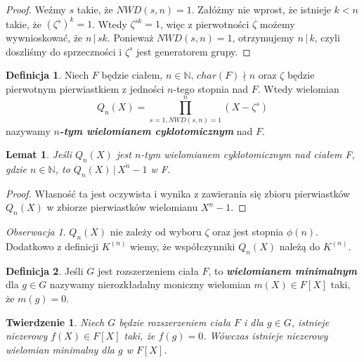 \documentclass[declaration,shortabstract]{iithesis}
\theoremstyle{definition}
\newtheorem{definition}{Definicja}
\theoremstyle{remark} \newtheorem{observation}{Obserwacja}
\theoremstyle{plain} \newtheorem{theorem}{Twierdzenie}
\theoremstyle{plain} \newtheorem{lemma}{Lemat}
\theoremstyle{remark} \newtheorem*{remark*}{Uwaga}
\theoremstyle{reminder} \newtheorem*{reminder*}{Przypomnienie}
\begin{document}
\begin{proof}
    Weźmy $s$ takie, że $NWD(s, n) = 1$. Załóżmy nie wprost, że istnieje $k < n$ takie, że $(\zeta^s)^k = 1$. Wtedy $\zeta^{sk} = 1$, więc z pierwotności $\zeta$ możemy wywnioskować, że $n \, | \, sk$. Ponieważ $NWD(s, n) = 1$, otrzymujemy $n \, | \, k$, czyli doszliśmy do sprzeczności i $\zeta^s$ jest generatorem grupy.
\end{proof}
	
\begin{definition}
	Niech $F$ będzie ciałem, $n \in \mathbb{N}, \, char(F) \nmid n$ oraz $\zeta$ będzie pierwotnym pierwiastkiem z jedności $n$-tego stopnia nad $F$. Wtedy wielomian \[Q_n(X) = \prod_{s = 1, NWD(s, n) = 1}^{n}(X - \zeta^s)\] nazywamy \textit{\textbf{$n$-tym wielomianem cyklotomicznym}} nad $F$.
\end{definition}
	
\begin{lemma}\label{cyklo_dzieli}
	Jeśli $Q_n(X)$ jest $n$-tym wielomianem cyklotomicznym nad ciałem F, gdzie $n\in \mathbb{N}$, to $Q_n(X) \, | \, X^n - 1$ w F.
\end{lemma}
	
\begin{proof} 
	Własność ta jest oczywista i wynika z zawierania się zbioru pierwiastków $Q_n(X)$ w zbiorze pierwiastków wielomianu $X^n - 1$.
\end{proof}
	
\begin{observation}
	$Q_n(X)$ nie zależy od wyboru $\zeta$ oraz jest stopnia $\phi(n)$. Dodatkowo z definicji $K^{(n)}$ wiemy, że współczynniki $Q_n(X)$ należą do $K^{(n)}$.
\end{observation}
    

\begin{definition}
	Jeśli $G$ jest rozszerzeniem ciała $F$, to \textbf{\textit{wielomianem minimalnym}} dla $g \in G$ nazywamy nierozkładalny moniczny wielomian $m(X) \in F[X]$ taki, że $m(g) = 0$.
\end{definition}
	
\begin{theorem}\label{istnieje_mini}
	Niech $G$ będzie rozszerzeniem ciała $F$ i dla $g \in G$, istnieje niezerowy $f(X) \in F[X]$ taki, że $ f(g) = 0$. Wówczas istnieje niezerowy wielomian minimalny dla $g$ w $F[X]$.
\end{theorem}
	
\end{document}
